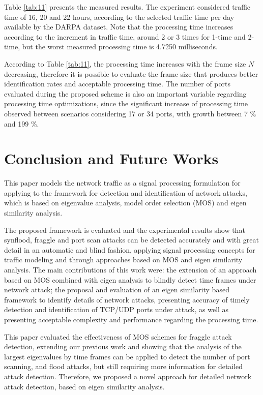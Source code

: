 \documentclass[review]{elsarticle}
\begin{document}
Table \ref{tab:11} presents the measured results. The experiment considered traffic time of 16, 20 and 22 hours, according to the selected traffic time per day available by the DARPA dataset. Note that the processing time increases according to the increment in traffic time, around 2 or 3 times for 1-time and 2-time, but the worst measured processing time is 4.7250 milliseconds.

According to Table \ref{tab:11}, the processing time increases with the frame size $N$ decreasing, therefore it is possible to evaluate the frame size that produces better identification rates and acceptable processing time. The number of ports evaluated during the proposed scheme is also an important variable regarding processing time optimizations, since the significant increase of processing time observed between scenarios considering 17 or 34 ports, with growth between 7 \% and 199 \%.

\section{Conclusion and Future Works}
\label{sec:conclusionandfutureworks}

This paper models the network traffic as a signal processing formulation for applying to the framework for detection and identification of network attacks, which is based on eigenvalue analysis, model order selection (MOS) and eigen similarity analysis.

The proposed framework is evaluated and the experimental results show that synflood, fraggle and port scan attacks can be detected accurately and with great detail in an automatic and blind fashion, applying signal processing concepts for traffic modeling and through approaches based on MOS and eigen similarity analysis. The main contributions of this work were: the extension of an approach based on MOS combined with eigen analysis to blindly detect time frames under network attack; the proposal and evaluation of an eigen similarity based framework to identify details of network attacks, presenting accuracy of timely detection and identification of TCP/UDP ports under attack, as well as presenting acceptable complexity and performance regarding the processing time.

This paper evaluated the effectiveness of MOS schemes for fraggle attack detection, extending our previous work \cite{tenorio2013greatest} and showing that the analysis of the largest eigenvalues by time frames can be applied to detect the number of port scanning, and flood attacks, but still requiring more information for detailed attack detection. Therefore, we proposed a novel approach for detailed network attack detection, based on eigen similarity analysis.
\end{document}
